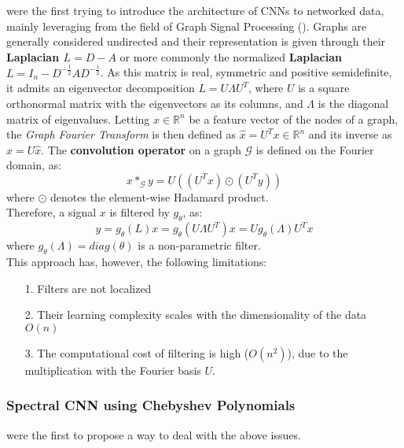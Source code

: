  \cite{bruna2013spectral} were the first
trying to introduce the architecture of CNNs to networked data,
mainly leveraging from the field of Graph Signal Processing (\cite{shuman2012emerging}).
Graphs are generally considered undirected and their representation is given
through their \textbf{Laplacian $L = D -A$} or more commonly the normalized
\textbf{Laplacian $L = I_n - D^{-\frac{1}{2}}AD^{-\frac{1}{2}}$}. As this matrix
is real, symmetric and positive semidefinite, it admits an eigenvector
decomposition $L=U\Lambda U^T$, where $U$ is a square orthonormal matrix with
the eigenvectors as its columns, and $\Lambda$ is the diagonal matrix of eigenvalues.
Letting $x\in \mathbb{R}^{n}$ be a feature vector of the nodes of a graph,
the {\em Graph Fourier Transform} is then defined as $\hat{x}=U^T x \in \mathbb{R}^n$
and its inverse as $x = U\hat{x}$. The \textbf{convolution operator} on a graph
$\mathcal{G}$ is defined on the Fourier domain, as:
\begin{equation*}
x *_{\mathcal{G}} y = U((U^T x)\odot (U^T y))
\end{equation*}
where $\odot$ denotes the element-wise Hadamard product.\\
Therefore, a signal $x$ is filtered by $g_{\theta}$, as:\\
\begin{equation}
y = g_{\theta}(L)x = g_{\theta} (U\Lambda U^T)x = U g_{\theta}(\Lambda ) U^T x
\end{equation}
where $g_{\theta}(\Lambda) = diag(\theta)$ is a non-parametric filter.\\
This approach has, however, the following limitations:
\begin{itemize}
\item [1.] Filters are not localized
\item [2.] Their learning complexity scales with the dimensionality of the data $O(n)$
\item [3.] The computational cost of filtering is high ($O(n^2)$), due to the
multiplication with the Fourier basis $U$.
\end{itemize}

\subsubsection*{Spectral CNN using Chebyshev Polynomials}
\cite{defferrard2016convolutional} were the first to propose a way to deal with
the above issues.\\

